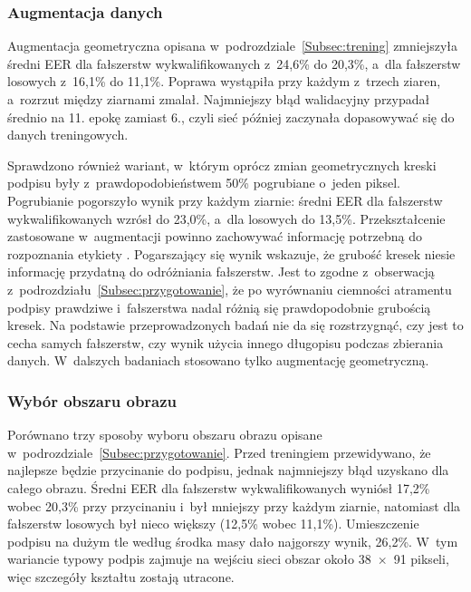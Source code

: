\documentclass[12pt, twoside, openright]{article}
\begin{document}
\subsubsection*{Augmentacja danych}

Augmentacja geometryczna opisana w~podrozdziale~\ref{Subsec:trening} zmniejszyła średni EER dla fałszerstw wykwalifikowanych z~24,6\% do 20,3\%, a~dla fałszerstw losowych z~16,1\% do 11,1\%.
Poprawa wystąpiła przy każdym z~trzech ziaren, a~rozrzut między ziarnami zmalał.
Najmniejszy błąd walidacyjny przypadał średnio na 11. epokę zamiast 6., czyli sieć później zaczynała dopasowywać się do danych treningowych.

Sprawdzono również wariant, w~którym oprócz zmian geometrycznych kreski podpisu były z~prawdopodobieństwem 50\% pogrubiane o~jeden piksel.
Pogrubianie pogorszyło wynik przy każdym ziarnie: średni EER dla fałszerstw wykwalifikowanych wzrósł do 23,0\%, a~dla losowych do 13,5\%.
Przekształcenie zastosowane w~augmentacji powinno zachowywać informację potrzebną do rozpoznania etykiety \cite{shorten2019}.
Pogarszający się wynik wskazuje, że grubość kresek niesie informację przydatną do odróżniania fałszerstw.
Jest to zgodne z~obserwacją z~podrozdziału~\ref{Subsec:przygotowanie}, że po wyrównaniu ciemności atramentu podpisy prawdziwe i~fałszerstwa nadal różnią się prawdopodobnie grubością kresek.
Na podstawie przeprowadzonych badań nie da się rozstrzygnąć, czy jest to cecha samych fałszerstw, czy wynik użycia innego długopisu podczas zbierania danych.
W~dalszych badaniach stosowano tylko augmentację geometryczną.

\subsubsection*{Wybór obszaru obrazu}

Porównano trzy sposoby wyboru obszaru obrazu opisane w~podrozdziale~\ref{Subsec:przygotowanie}.
Przed treningiem przewidywano, że najlepsze będzie przycinanie do podpisu, jednak najmniejszy błąd uzyskano dla całego obrazu.
Średni EER dla fałszerstw wykwalifikowanych wyniósł 17,2\% wobec 20,3\% przy przycinaniu i~był mniejszy przy każdym ziarnie, natomiast dla fałszerstw losowych był nieco większy (12,5\% wobec 11,1\%).
Umieszczenie podpisu na dużym tle według środka masy dało najgorszy wynik, 26,2\%.
W~tym wariancie typowy podpis zajmuje na wejściu sieci obszar około 38~$\times$~91 pikseli, więc szczegóły kształtu zostają utracone.
\end{document}
